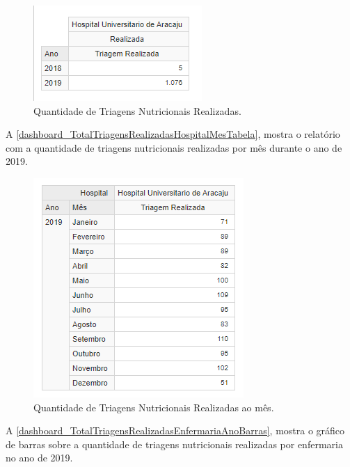 \begin{figure}[htb]
	\caption{\label{dashboard_TotalTriagensRealizadasHospitalAnoTabela}Quantidade de Triagens Nutricionais Realizadas.}
	\begin{center}
	    \includegraphics[scale=1]{Imagens/1.1.TotalTriagensRealizadasHospitalAnoTabela.png}
	\end{center}
\end{figure}

A \autoref{dashboard_TotalTriagensRealizadasHospitalMesTabela}, mostra o relatório com a quantidade de triagens nutricionais realizadas por mês durante o ano de 2019. 

\begin{figure}[htb]
	\caption{\label{dashboard_TotalTriagensRealizadasHospitalMesTabela}Quantidade de Triagens Nutricionais Realizadas ao mês.}
	\begin{center}
	    \includegraphics[scale=1]{Imagens/1.2.TotalTriagensRealizadasHospitalMesTabela.png}
	\end{center}
\end{figure}

A \autoref{dashboard_TotalTriagensRealizadasEnfermariaAnoBarras}, mostra o gráfico de barras sobre a quantidade de triagens nutricionais realizadas por enfermaria no ano de 2019.

